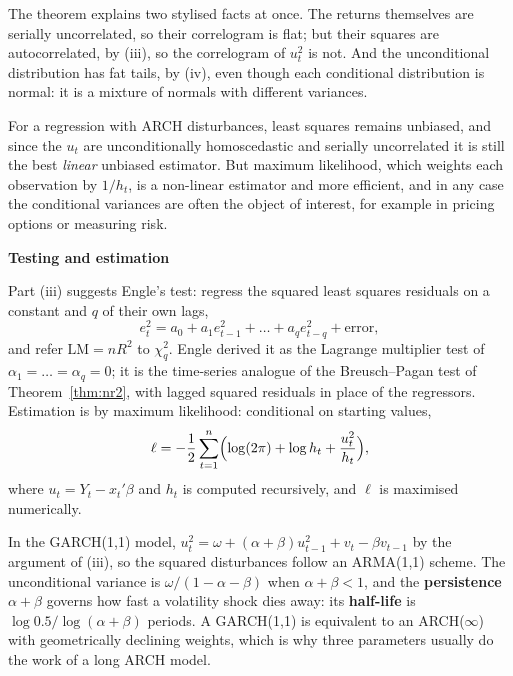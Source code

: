 \documentclass[11pt,a4paper]{article}
\numberwithin{equation}{section}
\theoremstyle{definition}
\newcommand{\subhead}[1]{%
  \par\medskip\noindent\textbf{#1}\par\nobreak\smallskip}
\begin{document}
The theorem explains two stylised facts at once. The returns themselves are serially uncorrelated, so their correlogram is flat; but their
squares are autocorrelated, by (iii), so the correlogram of $u_t^2$ is not. And the unconditional distribution has fat tails, by (iv), even though each
conditional distribution is normal: it is a mixture of normals with different variances.

For a regression with ARCH disturbances, least squares remains unbiased, and since the $u_t$ are unconditionally homoscedastic and serially
uncorrelated it is still the best \emph{linear} unbiased estimator. But maximum likelihood, which weights each observation by $1/h_t$, is a non-linear
estimator and more efficient, and in any case the conditional variances are often the object of interest, for example in pricing options or
measuring risk.

\subhead{Testing and estimation}
Part (iii) suggests Engle's test: regress the squared least squares residuals on a constant and $q$ of their own lags,
\[
e_t^2 = a_0 + a_1e_{t-1}^2 + \dots + a_qe_{t-q}^2 + \text{error},
\]
and refer $\text{LM} = nR^2$ to $\chi^2_q$. Engle derived it as the Lagrange multiplier test of $\alpha_1 = \dots = \alpha_q = 0$; it is the time-series analogue of the
Breusch--Pagan test of Theorem~\ref{thm:nr2}, with lagged squared residuals in place of the regressors. Estimation is by maximum likelihood: conditional on
starting values,
\[
\ell = -\frac12\sum_{t=1}^n\Bigl(\log(2\pi) + \log h_t + \frac{u_t^2}{h_t}\Bigr),
\]
where $u_t = Y_t - x_t'\beta$ and $h_t$ is computed recursively, and $\ell$ is maximised numerically.

In the GARCH(1,1) model, $u_t^2 = \omega + (\alpha + \beta)u_{t-1}^2 + v_t - \beta v_{t-1}$ by the argument of (iii), so the squared disturbances follow an ARMA(1,1) scheme. The
unconditional variance is $\omega/(1 - \alpha - \beta)$ when $\alpha + \beta < 1$, and the \textbf{persistence} $\alpha + \beta$ governs how fast a volatility shock dies away: its
\textbf{half-life} is $\log 0.5/\log(\alpha + \beta)$ periods. A GARCH(1,1) is equivalent to an ARCH($\infty$) with geometrically declining weights, which is why three
parameters usually do the work of a long ARCH model.
\end{document}
